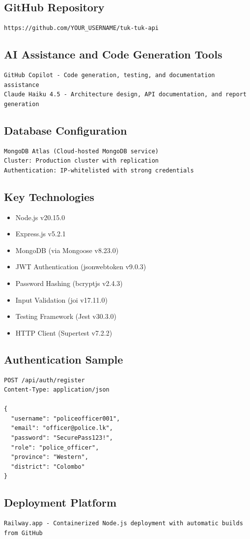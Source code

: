 \documentclass[12pt,a4paper]{article}
\begin{document}
\subsection*{GitHub Repository}
\begin{verbatim}
https://github.com/YOUR_USERNAME/tuk-tuk-api
\end{verbatim}

\subsection*{AI Assistance and Code Generation Tools}
\begin{verbatim}
GitHub Copilot - Code generation, testing, and documentation assistance
Claude Haiku 4.5 - Architecture design, API documentation, and report generation
\end{verbatim}

\subsection*{Database Configuration}
\begin{verbatim}
MongoDB Atlas (Cloud-hosted MongoDB service)
Cluster: Production cluster with replication
Authentication: IP-whitelisted with strong credentials
\end{verbatim}

\subsection*{Key Technologies}
\begin{itemize}
\item Node.js v20.15.0
\item Express.js v5.2.1
\item MongoDB (via Mongoose v8.23.0)
\item JWT Authentication (jsonwebtoken v9.0.3)
\item Password Hashing (bcryptjs v2.4.3)
\item Input Validation (joi v17.11.0)
\item Testing Framework (Jest v30.3.0)
\item HTTP Client (Supertest v7.2.2)
\end{itemize}

\subsection*{Authentication Sample}
\begin{verbatim}
POST /api/auth/register
Content-Type: application/json

{
  "username": "policeofficer001",
  "email": "officer@police.lk",
  "password": "SecurePass123!",
  "role": "police_officer",
  "province": "Western",
  "district": "Colombo"
}
\end{verbatim}

\subsection*{Deployment Platform}
\begin{verbatim}
Railway.app - Containerized Node.js deployment with automatic builds from GitHub
\end{verbatim}
\end{document}
